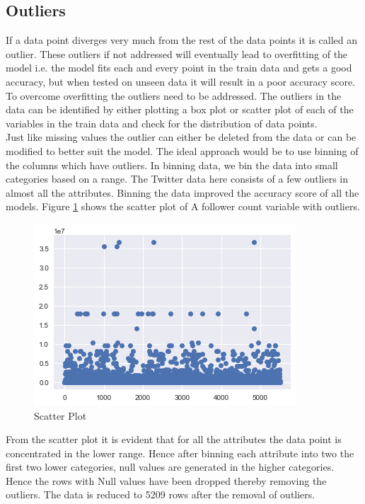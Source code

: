 \documentclass[sigconf]{acmart}
\begin{document}
\subsection{Outliers}
If a data point diverges very much from the rest of the data points it is called an outlier. These outliers if not addressed will eventually lead to overfitting of the model i.e. the model fits each and every point in the train data and gets a good accuracy, but when tested on unseen data it will result in a poor accuracy score. To overcome overfitting the outliers need to be addressed. The outliers in the data can be identified by either plotting a box plot or scatter plot of each of the variables in the train data and check for the distribution of data points.\\
Just like missing values the outlier can either be deleted from the data or can be modified to better suit the model. The ideal approach would be to use binning of the columns which have outliers. In binning data, we bin the data into small categories based on a range. The Twitter data here consists of a few outliers in almost all the attributes. Binning the data improved the accuracy score of all the models. Figure \ref{fig:Fig3} shows the scatter plot of A follower count variable with outliers. \\

\begin{figure}
\includegraphics[width=1.0\columnwidth]{images/fig3.png}
\caption{Scatter Plot}
\label{fig:Fig3}
\end{figure}

From the scatter plot it is evident that for all the attributes the data point is concentrated in the lower range. Hence after binning each attribute into two the first two lower categories, null values are generated in the higher categories. Hence the rows with Null values have been dropped thereby removing the outliers. The data is reduced to 5209 rows after the removal of outliers. 
\end{document}
